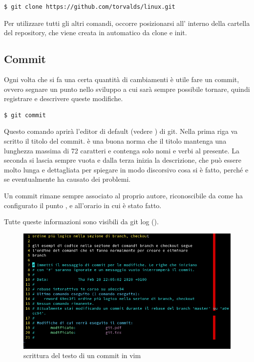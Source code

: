 \documentclass{article}
\begin{document}
\begin{verbatim}
$ git clone https://github.com/torvalds/linux.git
\end{verbatim}

Per utilizzare tutti gli altri comandi, occorre posizionarsi all' interno della
cartella del repository, che viene creata in automatico da clone e init.

\subsection{Commit}
Ogni volta che si fa una certa quantità di cambiamenti è utile fare un commit,
ovvero segnare un punto nello sviluppo a cui sarà sempre possibile tornare,
quindi registrare e descrivere queste modifiche.

\begin{verbatim}
$ git commit
\end{verbatim}

Questo comando aprirà l'editor di default (vedere ) di git.
Nella prima riga va scritto il titolo del commit.
è una buona norma che il titolo mantenga una lunghezza massima di 72 caratteri
e contenga solo nomi e verbi al presente.
La seconda si lascia sempre vuota e dalla terza inizia la descrizione, che può essere
molto lunga e dettagliata per spiegare in modo discorsivo cosa si è fatto, 
perché e se eventualmente ha causato dei problemi.

Un commit rimane sempre associato al proprio autore, riconoscibile da come ha
configurato il punto , e all'orario in cui è stato fatto.

Tutte queste informazioni sono visibili da git log ().

\begin{figure}
\includegraphics[width=6in]{img/vimEditCommit.png}
\centering
\caption{scrittura del testo di un commit in vim}
\end{figure}
\end{document}
